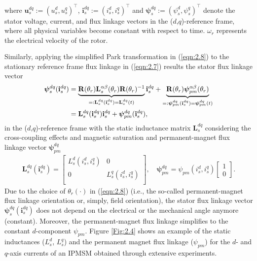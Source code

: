 where $\mathbf{u}^{dq}_s := (u^d_s, u^q_s)^\top$, $\mathbf{i}^{dq}_s := (i^d_s, i^q_s)^\top$ and $\boldsymbol{\psi}^{dq}_s := (\psi^d_s, \psi^q_s)^\top$ denote the stator voltage, current, and flux linkage vectors in the ($d$,$q$)-reference frame, where all physical variables become constant with respect to time. $\omega_r$ represents the electrical velocity of the rotor.

Similarly, applying the simplified Park transformation in (\ref{eqn:2.8}) to the stationary reference frame flux linkage in  (\ref{eqn:2.7}) results the stator flux linkage vector
\begin{align}\notag
\boldsymbol{\psi}^{dq}_s(\mathbf{i}^{dq}_s) 
&=\underbrace{\mathbf{R}(\theta_r)\mathbf{L}^{\alpha\beta}_s(\theta_r)\mathbf{R}(\theta_r)^{-1}}_{=:\mathbf{L}^{dq}_s(\mathbf{i}^{dq}_s)=\mathbf{L}^{dq}_s(t)}\mathbf{i}^{dq}_s
+ \underbrace{\mathbf{R}(\theta_r)\boldsymbol{\psi}^{\alpha\beta}_{pm}(\theta_r)}_{=:\boldsymbol{\psi}^{dq}_{pm}(\mathbf{i}^{dq}_s)=\boldsymbol{\psi}^{dq}_{pm}(t)}
\\\label{eqn:2.10}
&= \mathbf{L}^{dq}_s(\mathbf{i}^{dq}_s)\mathbf{i}^{dq}_s + \boldsymbol{\psi}^{dq}_{pm}(\mathbf{i}^{dq}_s),
\end{align}
in the ($d$,$q$)-reference frame with the static inductance matrix $\mathbf{L}^{dq}_s$ considering the cross-coupling effects and magnetic saturation \cite{c2.1_2} and permanent-magnet flux linkage vector $\boldsymbol{\psi}^{dq}_{pm}$ 
\begin{align}\label{eqn:2.11}
\mathbf{L}^{dq}_s(\mathbf{i}^{dq}_s) = \begin{bmatrix}
L^d_s(i^d_s,i^q_s) & 0 \\
0 & L^q_s(i^d_s,i^q_s) \\
\end{bmatrix}, \quad {\boldsymbol{\psi}^{dq}_{pm} = \psi_{pm}(i^d_s,i^q_s) \begin{bmatrix}
1 \\
0
\end{bmatrix}}.
\end{align}
Due to the choice of $\theta_r(\cdot)$ in (\ref{eqn:2.8}) (i.e., the so-called permanent-magnet flux linkage orientation or, simply, field orientation), the stator flux linkage vector $\bm{\psi}^{dq}_s(\bm{i}^{dq}_s)$ does not depend on the electrical or the mechanical angle anymore (constant). Moreover, the permanent-magnet flux linkage simplifies to the constant $d$-component $\psi_{pm}$. Figure \ref{Fig:2.4} shows an example of the static inductances ($L^d_s$, $L^q_s$) and the permanent magnet flux linkage ($\psi_{pm}$) for the $d$- and $q$-axis currents of an IPMSM obtained through extensive experiments.

